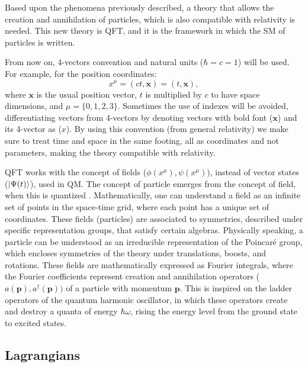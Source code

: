 Based upon the phenomena previously described, a theory that allows the creation and annihilation of particles, which is also compatible with relativity is needed. This new theory is QFT, and it is the framework in which the SM of particles is written.

From now on, 4-vectors convention and natural units ($\hbar=c=1$) will be used. For example, for the position coordinates:
\begin{equation*}
    x^{\mu} = (ct, \bm{x}) = (t, \bm{x}),
\end{equation*}
where $\bm{x}$ is the usual position vector, $t$ is multiplied by $c$ to have space dimensions, and $\mu=\{0,1,2,3\}$. Sometimes the use of indexes will be avoided, differentiating vectors from 4-vectors by denoting vectors with bold font ($\bm{x}$) and its 4-vector as ($x$). By using this convention (from general relativity) we make sure to treat time and space in the same footing, all as coordinates and not parameters, making the theory compatible with relativity.

QFT works with the concept of fields ($\phi(x^{\mu}), \psi(x^{\mu})$), instead of vector states ($\ket{\Psi(t)}$), used in QM. The concept of particle emerges from the concept of field, when this is quantized \cite{Lahiri}. Mathematically, one can understand a field as an infinite set of points in the space-time grid, where each point has a unique set of coordinates. These fields (particles) are associated to symmetries, described under specific representation groups, that satisfy certain algebras. Physically speaking, a particle can be understood as an irreducible representation of the Poincaré group, which encloses symmetries of the theory under translations, boosts, and rotations. These fields are mathematically expressed as Fourier integrals, where the Fourier coefficients represent creation and annihilation operators ($a(\bm{p}), a^{\dagger}(\bm{p}))$ of a particle with momentum $\bm{p}$. This is inspired on the ladder operators of the quantum harmonic oscillator, in which these operators create and destroy a quanta of energy $\hbar\omega$, rising the energy level from the ground state to excited states.

\subsection{Lagrangians} \label{ssec:lagrangians}

